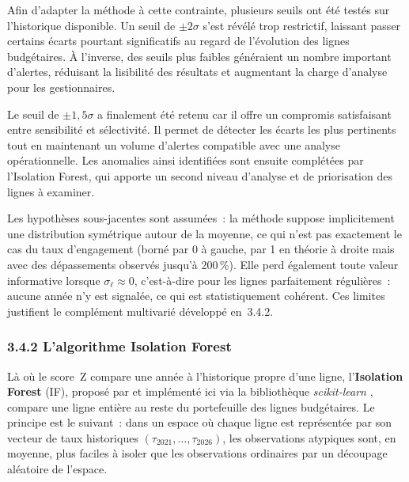 Afin d'adapter la m\'ethode \`a cette contrainte, plusieurs seuils ont \'et\'e
test\'es sur l'historique disponible. Un seuil de $\pm 2\sigma$ s'est r\'ev\'el\'e
trop restrictif, laissant passer certains \'ecarts pourtant significatifs au
regard de l'\'evolution des lignes budg\'etaires. \`A l'inverse, des seuils
plus faibles g\'en\'eraient un nombre important d'alertes, r\'eduisant la
lisibilit\'e des r\'esultats et augmentant la charge d'analyse pour les
gestionnaires.

Le seuil de $\pm 1{,}5\sigma$ a finalement \'et\'e retenu car il offre un
compromis satisfaisant entre sensibilit\'e et s\'electivit\'e. Il permet de
d\'etecter les \'ecarts les plus pertinents tout en maintenant un volume
d'alertes compatible avec une analyse op\'erationnelle. Les anomalies ainsi
identifi\'ees sont ensuite compl\'et\'ees par l'Isolation Forest, qui apporte
un second niveau d'analyse et de priorisation des lignes \`a examiner.

Les hypoth\`eses sous-jacentes sont assum\'ees~: la m\'ethode suppose
implicitement une distribution sym\'etrique autour de la moyenne, ce qui
n'est pas exactement le cas du taux d'engagement (born\'e par 0 \`a gauche,
par 1 en th\'eorie \`a droite mais avec des d\'epassements observ\'es jusqu'\`a
200\,\%). Elle perd \'egalement toute valeur informative lorsque
$\sigma_\ell \approx 0$, c'est-\`a-dire pour les lignes parfaitement
r\'eguli\`eres~: aucune ann\'ee n'y est signal\'ee, ce qui est statistiquement
coh\'erent. Ces limites justifient le compl\'ement multivari\'e
d\'evelopp\'e en~3.4.2.

\subsubsection*{3.4.2 \quad L'algorithme Isolation Forest}

L\`a o\`u le score~Z compare une ann\'ee \`a l'historique propre d'une ligne,
l'\textbf{Isolation Forest} (IF), propos\'e par \citet{Liu2008} et impl\'ement\'e
ici via la biblioth\`eque \textit{scikit-learn} \citep{Pedregosa2011},
compare une ligne enti\`ere au reste du portefeuille des lignes
budg\'etaires. Le principe est le suivant~: dans un espace o\`u chaque ligne
est repr\'esent\'ee par son vecteur de taux historiques
$(\tau_{2021}, \dots, \tau_{2026})$, les observations atypiques sont, en
moyenne, plus faciles \`a isoler que les observations ordinaires par un
d\'ecoupage al\'eatoire de l'espace.

